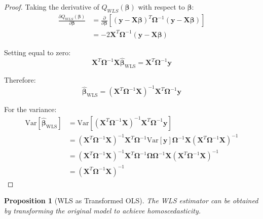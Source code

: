 \documentclass{article}
\newtheorem{proposition}{Proposition}
\begin{document}
\begin{proof}
Taking the derivative of $Q_{WLS}(\boldsymbol{\beta})$ with respect to $\boldsymbol{\beta}$:
\begin{align}
\frac{\partial Q_{WLS}(\boldsymbol{\beta})}{\partial \boldsymbol{\beta}} &= \frac{\partial}{\partial \boldsymbol{\beta}}[(\mathbf{y} - \mathbf{X}\boldsymbol{\beta})^T\boldsymbol{\Omega}^{-1}(\mathbf{y} - \mathbf{X}\boldsymbol{\beta})] \\
&= -2\mathbf{X}^T\boldsymbol{\Omega}^{-1}(\mathbf{y} - \mathbf{X}\boldsymbol{\beta})
\end{align}

Setting equal to zero:
\begin{equation}
\mathbf{X}^T\boldsymbol{\Omega}^{-1}\mathbf{X}\hat{\boldsymbol{\beta}}_{\text{WLS}} = \mathbf{X}^T\boldsymbol{\Omega}^{-1}\mathbf{y}
\end{equation}

Therefore:
\begin{equation}
\hat{\boldsymbol{\beta}}_{\text{WLS}} = (\mathbf{X}^T\boldsymbol{\Omega}^{-1}\mathbf{X})^{-1}\mathbf{X}^T\boldsymbol{\Omega}^{-1}\mathbf{y}
\end{equation}

For the variance:
\begin{align}
\text{Var}[\hat{\boldsymbol{\beta}}_{\text{WLS}}] &= \text{Var}[(\mathbf{X}^T\boldsymbol{\Omega}^{-1}\mathbf{X})^{-1}\mathbf{X}^T\boldsymbol{\Omega}^{-1}\mathbf{y}] \\
&= (\mathbf{X}^T\boldsymbol{\Omega}^{-1}\mathbf{X})^{-1}\mathbf{X}^T\boldsymbol{\Omega}^{-1}\text{Var}[\mathbf{y}]\boldsymbol{\Omega}^{-1}\mathbf{X}(\mathbf{X}^T\boldsymbol{\Omega}^{-1}\mathbf{X})^{-1} \\
&= (\mathbf{X}^T\boldsymbol{\Omega}^{-1}\mathbf{X})^{-1}\mathbf{X}^T\boldsymbol{\Omega}^{-1}\boldsymbol{\Omega}\boldsymbol{\Omega}^{-1}\mathbf{X}(\mathbf{X}^T\boldsymbol{\Omega}^{-1}\mathbf{X})^{-1} \\
&= (\mathbf{X}^T\boldsymbol{\Omega}^{-1}\mathbf{X})^{-1}
\end{align}
\end{proof}

\begin{proposition}[WLS as Transformed OLS]
The WLS estimator can be obtained by transforming the original model to achieve homoscedasticity.
\end{proposition}
\end{document}
